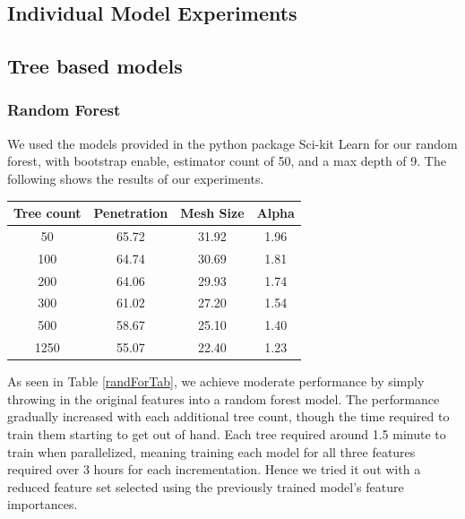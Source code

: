 \documentclass[a4paper, 12pt]{article}
\begin{document}
\begin{multicols}{2}
        \section{Individual Model Experiments}        
            \subsection{Tree based models}
                \subsubsection{Random Forest}
                We used the models provided in the python package Sci-kit Learn \cite{scikit-learn} for our random forest, with bootstrap enable, estimator count of 50, and a max depth of 9. The following shows the results of our experiments.
                \begin{center}
                    \begin{tabular}{c|ccc}
                        Tree count & Penetration & Mesh Size & Alpha\\
                        \hline
                        50 & 65.72 & 31.92 & 1.96 \\
                        100 & 64.74 & 30.69 & 1.81 \\
                        200 & 64.06 & 29.93 & 1.74 \\
                        300 & 61.02 & 27.20 & 1.54 \\
                        500 & 58.67 & 25.10 & 1.40 \\
                        1250 & 55.07 & 22.40 & 1.23
                    \end{tabular}
                    \label{randForTab}
                \end{center}

                As seen in Table \ref{randForTab}, we achieve moderate performance by simply throwing in the original features into a random forest model. The performance gradually increased with each additional tree count, though the time required to train them starting to get out of hand. Each tree required around 1.5 minute to train when parallelized, meaning training each model for all three features required over 3 hours for each incrementation. Hence we tried it out with a reduced feature set selected using the previously trained model's feature importances.


\end{multicols}
\end{document}
